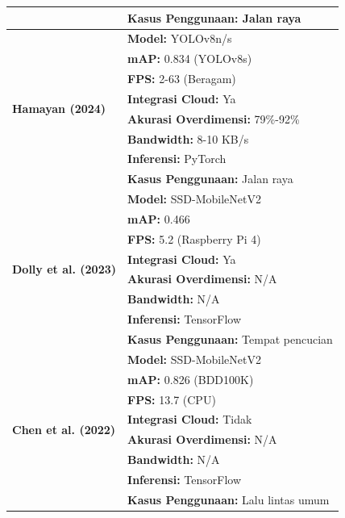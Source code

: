 \begin{table}[htbp]
\begin{tabular}{|l|l|}
    & \textbf{Kasus Penggunaan:} Jalan raya \\
    \hline
    \multirow{8}{*}{\textbf{Hamayan (2024) \parencite*{hamayan2024}}} & \textbf{Model:} YOLOv8n/s \\
    \cline{2-2}
    & \textbf{mAP:} 0.834 (YOLOv8s) \\
    \cline{2-2}
    & \textbf{FPS:} 2-63 (Beragam) \\
    \cline{2-2}
    & \textbf{Integrasi Cloud:} Ya \\
    \cline{2-2}
    & \textbf{Akurasi Overdimensi:} 79\%-92\% \\
    \cline{2-2}
    & \textbf{Bandwidth:} 8-10 KB/s \\
    \cline{2-2}
    & \textbf{Inferensi:} PyTorch \\
    \cline{2-2}
    & \textbf{Kasus Penggunaan:} Jalan raya \\
    \hline
    \multirow{8}{*}{\textbf{Dolly et al. (2023) \parencite*{dolly2023}}} & \textbf{Model:} SSD-MobileNetV2 \\
    \cline{2-2}
    & \textbf{mAP:} 0.466 \\
    \cline{2-2}
    & \textbf{FPS:} 5.2 (Raspberry Pi 4) \\
    \cline{2-2}
    & \textbf{Integrasi Cloud:} Ya \\
    \cline{2-2}
    & \textbf{Akurasi Overdimensi:} N/A \\
    \cline{2-2}
    & \textbf{Bandwidth:} N/A \\
    \cline{2-2}
    & \textbf{Inferensi:} TensorFlow \\
    \cline{2-2}
    & \textbf{Kasus Penggunaan:} Tempat pencucian \\
    \hline
    \multirow{8}{*}{\textbf{Chen et al. (2022) \parencite*{Chen2022Fast}}} & \textbf{Model:} SSD-MobileNetV2 \\
    \cline{2-2}
    & \textbf{mAP:} 0.826 (BDD100K) \\
    \cline{2-2}
    & \textbf{FPS:} 13.7 (CPU) \\
    \cline{2-2}
    & \textbf{Integrasi Cloud:} Tidak \\
    \cline{2-2}
    & \textbf{Akurasi Overdimensi:} N/A \\
    \cline{2-2}
    & \textbf{Bandwidth:} N/A \\
    \cline{2-2}
    & \textbf{Inferensi:} TensorFlow \\
    \cline{2-2}
    & \textbf{Kasus Penggunaan:} Lalu lintas umum \\
    \hline

\end{tabular}
\end{table}

